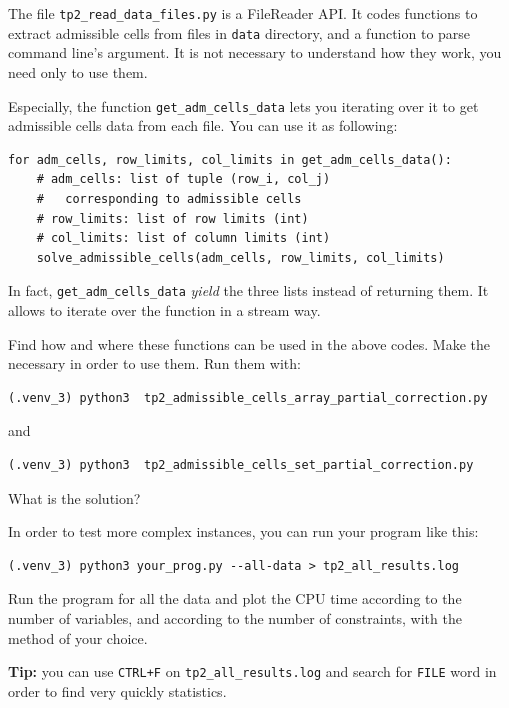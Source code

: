 \documentclass[a4paper, 12pt]{article}
\begin{document}
 The file \texttt{tp2\_read\_data\_files.py}  is a  FileReader API. It codes functions to extract admissible cells from files in \texttt{data} directory, and a function to parse command line's argument. It is not necessary to understand how they work, you need only to use them.

Especially, the function \texttt{get\_adm\_cells\_data} lets you iterating over it to get admissible cells data from each file. You can use it as following:

\begin{verbatim}
for adm_cells, row_limits, col_limits in get_adm_cells_data():
    # adm_cells: list of tuple (row_i, col_j)
    #   corresponding to admissible cells
    # row_limits: list of row limits (int)
    # col_limits: list of column limits (int)
    solve_admissible_cells(adm_cells, row_limits, col_limits)
\end{verbatim}

In fact, \texttt{get\_adm\_cells\_data} \emph{yield} the three lists instead of returning them. It allows to iterate over the function in a stream way.

\begin{question}
Find how and where these functions can be used in the above codes.  Make the necessary in order to use them. 
Run them with:
\begin{verbatim}
(.venv_3) python3  tp2_admissible_cells_array_partial_correction.py
\end{verbatim}
  and 
\begin{verbatim}
(.venv_3) python3  tp2_admissible_cells_set_partial_correction.py 
\end{verbatim} 

\noindent What is the solution?
\end{question}


\begin{question}
  In order to test more complex instances, you can run your program like this:
\begin{verbatim}
(.venv_3) python3 your_prog.py --all-data > tp2_all_results.log
\end{verbatim}
 
  Run the program for all the data and plot the CPU time according to the number of variables, and according to the number of constraints, with the method of your choice.

  \phantom{}

  \noindent\textbf{Tip:} you can use \texttt{CTRL+F} on \texttt{tp2\_all\_results.log} and search for \texttt{FILE} word in order to find very quickly statistics.
\end{question}
\end{document}

